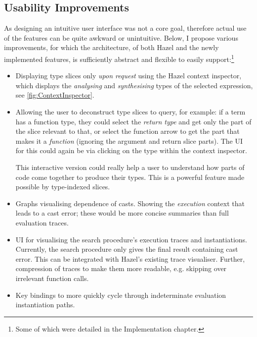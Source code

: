 \subsection{Usability Improvements}\label{sec:UIImprovements}
As designing an intuitive user interface was not a core goal, therefore actual use of the features can be quite awkward or unintuitive. Below, I propose various improvements, for which the architecture, of both Hazel and the newly implemented features, is sufficiently abstract and flexible to easily support:\footnote{Some of which were detailed in the Implementation chapter.}


\begin{itemize}
\item Displaying type slices only \textit{upon request} using the Hazel context inspector, which displays the \textit{analysing} and \textit{synthesising} types of the selected expression, see \cref{fig:ContextInspector}.
\item Allowing the user to deconstruct type slices to query, for example: if a term has a function type, they could select the \textit{return type} and get only the part of the slice relevant to that, or select the function arrow to get the part that makes it a \textit{function} (ignoring the argument and return slice parts). The UI for this could again be via clicking on the type within the context inspector.

This interactive version could really help a user to understand how parts of code come together to produce their types. This is a powerful feature made possible by type-indexed slices.
\item Graphs visualising dependence of casts. Showing the \textit{execution} context that leads to a cast error; these would be more concise summaries than full evaluation traces.
\item UI for visualising the search procedure's execution traces and instantiations. Currently, the search procedure only gives the final result containing cast error. This can be integrated with Hazel's existing trace visualiser. Further, compression of traces to make them more readable, e.g. skipping over irrelevant function calls.
\item Key bindings to more quickly cycle through indeterminate evaluation instantiation paths.
\end{itemize}